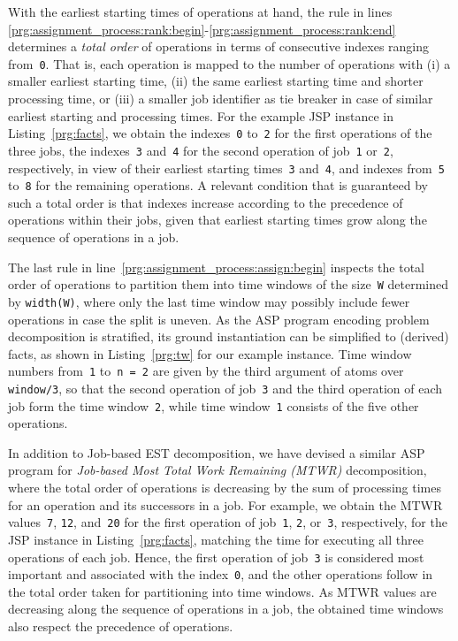 \documentclass{tlp} %
\begin{document}
With the earliest starting times of operations at hand,
the rule in lines \ref{prg:assignment_process:rank:begin}-\ref{prg:assignment_process:rank:end}
determines a \emph{total order} of operations in terms of consecutive indexes ranging
from~\lstinline{0}.
That is, each operation is mapped to the number of operations with
(i) a smaller earliest starting time,
(ii) the same earliest starting time and shorter processing time, or
(iii) a smaller job identifier as tie breaker in case of similar
earliest starting and processing times.
For the example JSP instance in Listing~\ref{prg:facts},
we obtain the indexes~\lstinline{0} to~\lstinline{2} for the first operations of the
three jobs,
the indexes~\lstinline{3} and~\lstinline{4} for the second operation of
job~\lstinline{1} or~\lstinline{2}, respectively,
in view of their earliest starting times~\lstinline{3} and~\lstinline{4},
and indexes from~\lstinline{5} to~\lstinline{8} for the remaining operations.
A relevant condition that is guaranteed by such a total order is that
indexes increase according to the precedence of operations within their jobs,
given that earliest starting times grow along the sequence of operations in a job.

The last rule in line~\ref{prg:assignment_process:assign:begin} inspects the total
order of operations to partition them into time windows of the size~\lstinline{W}
determined by \lstinline{width(W)},
where only the last time window may possibly include fewer operations in case the
split is uneven.
As the ASP program encoding problem decomposition is stratified, its ground
instantiation can be simplified to (derived) facts, as shown in Listing~\ref{prg:tw}
for our example instance.
Time window numbers from~\lstinline{1} to~\lstinline{n = 2} are given by
the third argument of atoms over \lstinline{window/3}, so that the second operation
of job~\lstinline{3} and the third operation of each job form the time window~\lstinline{2},
while time window~\lstinline{1} consists of the five other operations.
%


In addition to Job-based EST decomposition,
we have devised a similar ASP program for
\emph{Job-based Most Total Work Remaining (MTWR)} decomposition,
where the total order of operations is decreasing by the sum of processing
times for an operation and its successors in a job.
For example, we obtain the MTWR values~\lstinline{7}, \lstinline{12}, and~\lstinline{20}
for the first operation of job~\lstinline{1}, \lstinline{2}, or~\lstinline{3},
respectively, for the JSP instance in Listing~\ref{prg:facts},
matching the time for executing all three operations of each job.
Hence, the first operation of job~\lstinline{3} is considered most
important and associated with the index~\lstinline{0}, and the other
operations follow in the total order taken for partitioning into time windows.
As MTWR values are decreasing along the sequence of operations in a job, the obtained time windows
also respect the precedence of operations.
\end{document}
